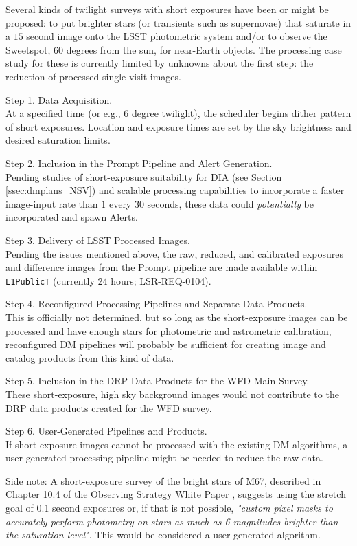 \documentclass[DM,lsstdoc,toc]{lsstdoc}
\begin{document}
Several kinds of twilight surveys with short exposures have been or might be proposed: to put brighter stars (or transients such as supernovae) that saturate in a $15$ second image onto the LSST photometric system and/or to observe the Sweetspot, 60 degrees from the sun, for near-Earth objects. The processing case study for these is currently limited by unknowns about the first step: the reduction of processed single visit images.

Step 1. Data Acquisition. \\
At a specified time (or e.g., 6 degree twilight), the scheduler begins dither pattern of short exposures. Location and exposure times are set by the sky brightness and desired saturation limits.

Step 2. Inclusion in the Prompt Pipeline and Alert Generation. \\
Pending studies of short-exposure suitability for DIA (see Section \ref{ssec:dmplans_NSV}) and scalable processing capabilities to incorporate a faster image-input rate than $1$ every $30$ seconds, these data could {\it potentially} be incorporated and spawn Alerts.

Step 3. Delivery of LSST Processed Images. \\
Pending the issues mentioned above, the raw, reduced, and calibrated exposures and difference images from the Prompt pipeline are made available within  \texttt{L1PublicT} (currently 24 hours; LSR-REQ-0104).

Step 4. Reconfigured Processing Pipelines and Separate Data Products. \\
This is officially not determined, but so long as the short-exposure images can be processed and have enough stars for photometric and astrometric calibration, reconfigured DM pipelines will probably be sufficient for creating image and catalog products from this kind of data.

Step 5. Inclusion in the DRP Data Products for the WFD Main Survey. \\
These short-exposure, high sky background images would not contribute to the DRP data products created for the WFD survey.

Step 6. User-Generated Pipelines and Products. \\
If short-exposure images cannot be processed with the existing DM algorithms, a user-generated processing pipeline might be needed to reduce the raw data. 

Side note: A short-exposure survey of the bright stars of M67, described in Chapter 10.4 of the Observing Strategy White Paper \citep{2017arXiv170804058L}, suggests using the stretch goal of 0.1 second exposures or, if that is not possible, \textit{"custom pixel masks to accurately perform photometry on stars as much as 6 magnitudes brighter than the saturation level"}. This would be considered a user-generated algorithm.
\end{document}

